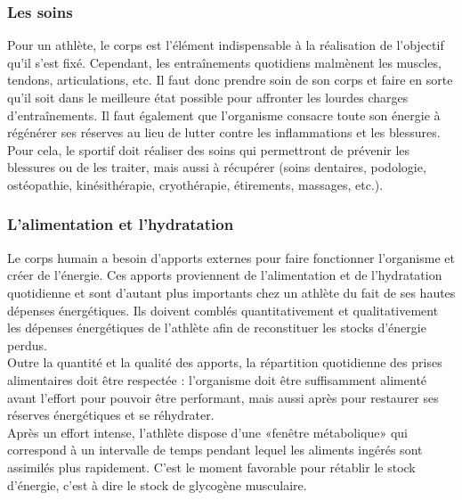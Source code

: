         
                 
                \subsubsection{Les soins}
   
                Pour un athlète, le corps est l'élément indispensable à la réalisation de l’objectif qu’il s’est fixé. Cependant, les entraînements quotidiens malmènent les muscles, tendons, articulations, etc.  Il faut donc prendre soin de son corps et faire en sorte qu'il soit dans le meilleure état possible pour affronter les lourdes charges d'entraînements. Il faut également que l'organisme consacre toute son énergie à régénérer ses réserves au lieu de lutter contre les inflammations et les blessures.\\
                
                Pour cela, le sportif doit réaliser des soins qui permettront de prévenir les blessures ou de les traiter, mais aussi à récupérer (soins dentaires, podologie, ostéopathie, kinésithérapie, cryothérapie, étirements, massages, etc.).\\
                
            
                \subsubsection{L'alimentation et l’hydratation}
                
                    Le corps humain a besoin d’apports externes pour faire fonctionner l’organisme et créer de l’énergie. Ces apports proviennent de l'alimentation et de l'hydratation quotidienne et sont d'autant plus importants chez un athlète du fait de ses hautes dépenses énergétiques.
                    Ils doivent comblés quantitativement et qualitativement les dépenses énergétiques de l'athlète afin de reconstituer les stocks d'énergie perdus.\\
                    
                    Outre la quantité et la qualité des apports, la répartition quotidienne des prises alimentaires doit être respectée : l’organisme doit être suffisamment alimenté avant l'effort pour pouvoir être performant, mais aussi après pour restaurer ses réserves énergétiques et se réhydrater.\\
                    
                    Après un effort intense, l'athlète dispose d'une «fenêtre métabolique» qui correspond à un intervalle de temps pendant lequel les aliments ingérés sont assimilés plus rapidement. C'est le moment favorable pour rétablir le stock d'énergie, c'est à dire le stock de glycogène musculaire.\\
                    
